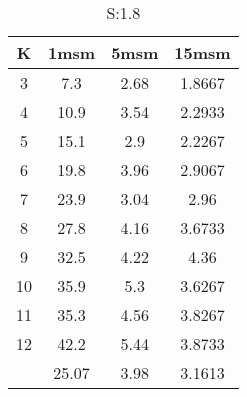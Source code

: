 \begin{table}[H]
\centering
\begin{tabular}{c|ccc}
K &1msm &5msm &15msm\\
\hline
3 & 7.3 & 2.68 & 1.8667\\
4 & 10.9 & 3.54 & 2.2933\\
5 & 15.1 & 2.9 & 2.2267\\
6 & 19.8 & 3.96 & 2.9067\\
7 & 23.9 & 3.04 & 2.96\\
8 & 27.8 & 4.16 & 3.6733\\
9 & 32.5 & 4.22 & 4.36\\
10 & 35.9 & 5.3 & 3.6267\\
11 & 35.3 & 4.56 & 3.8267\\
12 & 42.2 & 5.44 & 3.8733\\
\hline
& 25.07 & 3.98 & 3.1613\\
\end{tabular}
\caption{S:1.8}
\label{tab:s1.8}
\end{table}
